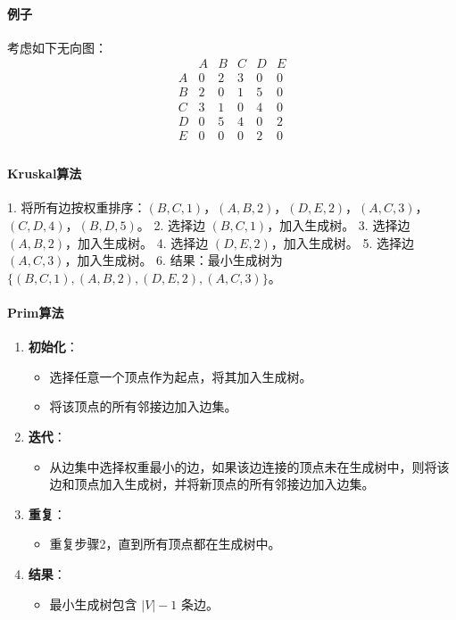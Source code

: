 \documentclass[UTF8]{ctexart}
\begin{document}
\paragraph{例子}
考虑如下无向图：
\[
\begin{array}{c|ccccc}
 & A & B & C & D & E \\
\hline
A & 0 & 2 & 3 & 0 & 0 \\
B & 2 & 0 & 1 & 5 & 0 \\
C & 3 & 1 & 0 & 4 & 0 \\
D & 0 & 5 & 4 & 0 & 2 \\
E & 0 & 0 & 0 & 2 & 0 \\
\end{array}
\]
\paragraph{Kruskal算法}
1. 将所有边按权重排序：\( (B, C, 1) \)，\( (A, B, 2) \)，\( (D, E, 2) \)，\( (A, C, 3) \)，\( (C, D, 4) \)，\( (B, D, 5) \)。
2. 选择边 \( (B, C, 1) \)，加入生成树。
3. 选择边 \( (A, B, 2) \)，加入生成树。
4. 选择边 \( (D, E, 2) \)，加入生成树。
5. 选择边 \( (A, C, 3) \)，加入生成树。
6. 结果：最小生成树为 \( \{(B, C, 1), (A, B, 2), (D, E, 2), (A, C, 3)\} \)。


\paragraph{Prim算法}
\begin{enumerate}
    \item \textbf{初始化}：
        \begin{itemize}
            \item 选择任意一个顶点作为起点，将其加入生成树。
            \item 将该顶点的所有邻接边加入边集。
        \end{itemize}
    \item \textbf{迭代}：
        \begin{itemize}
            \item 从边集中选择权重最小的边，如果该边连接的顶点未在生成树中，则将该边和顶点加入生成树，并将新顶点的所有邻接边加入边集。
        \end{itemize}
    \item \textbf{重复}：
        \begin{itemize}
            \item 重复步骤2，直到所有顶点都在生成树中。
        \end{itemize}
    \item \textbf{结果}：
        \begin{itemize}
            \item 最小生成树包含 \( |V| - 1 \) 条边。
        \end{itemize}
\end{enumerate}
\end{document}
